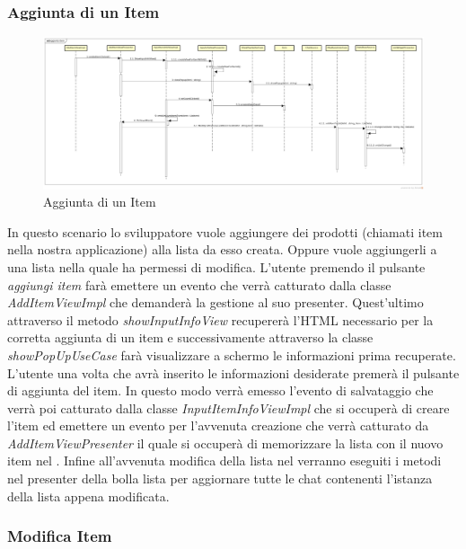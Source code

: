 \subsubsection{Aggiunta di un Item}

\label{Aggiunta di un Item}
\begin{figure}[H]
	\centering
	\includegraphics[width=\textwidth]{Sezioni/Diagrammi/App/aggiunta_item.jpg}
	\caption{Aggiunta di un Item}
\end{figure}

In questo scenario lo sviluppatore vuole aggiungere dei prodotti (chiamati item nella nostra applicazione) alla lista da esso creata. Oppure vuole aggiungerli a una lista nella quale ha permessi di modifica. L'utente premendo il pulsante \textit{aggiungi item} farà emettere un evento che verrà catturato dalla classe \textit{AddItemViewImpl} che demanderà la gestione al suo presenter. Quest'ultimo attraverso il metodo \textit{showInputInfoView} recupererà l'HTML necessario per la corretta aggiunta di un item e successivamente attraverso la classe \textit{showPopUpUseCase} farà visualizzare a schermo le informazioni prima recuperate. L'utente una volta che avrà inserito le informazioni desiderate premerà il pulsante di aggiunta del item. In questo modo verrà emesso l'evento di salvataggio che verrà poi catturato dalla classe \textit{InputItemInfoViewImpl} che si occuperà di creare l'item ed emettere un evento per l'avvenuta creazione che verrà catturato da \textit{AddItemViewPresenter} il quale si occuperà di memorizzare la  lista con il nuovo item nel . Infine all'avvenuta modifica della lista nel  verranno eseguiti i metodi nel presenter della bolla lista per aggiornare tutte le chat contenenti l'istanza della lista appena modificata. 




\subsubsection{Modifica Item}

